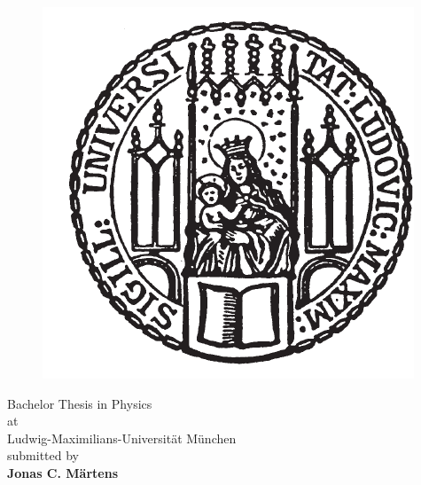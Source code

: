 \begin{titlepage}
\begin{center}
        \begin{figure}[h]
            \begin{center}
                \hspace*{-0.73cm}
                \includegraphics{lmu_siegel}
            \end{center}
            \label{fig:lmulogo}
        \end{figure}
        \vspace*{0.5cm}
        \Large
        \hspace*{-0.73cm}
        \hspace*{-0.5cm}Bachelor Thesis in Physics\\
        \vspace*{0.1cm}
        \hspace*{-0.73cm}
        \hspace*{-0.5cm}at\\
        \vspace*{0.1cm}
        \hspace*{-0.73cm}
        \hspace*{-0.5cm}Ludwig-Maximilians-Universität München\\
        \vspace*{3.5cm}
        \large
        \hspace*{-0.73cm}
        \hspace*{-0.8cm} submitted by\\
        \vspace*{0.1cm}
        \hspace*{-0.73cm}
        \hspace*{-0.7cm}\Large \textbf{Jonas C. Märtens}\\

    \end{center}
\end{titlepage}

\clearpage{\pagestyle{empty}\cleardoublepage}

